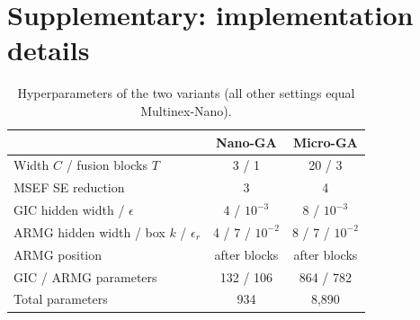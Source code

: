 \documentclass[10pt,twocolumn,letterpaper]{article}
\begin{document}
\section{Supplementary: implementation details}
\begin{table}[h]
\centering
\caption{Hyperparameters of the two variants (all other settings equal Multinex-Nano).}
\small
\begin{tabular}{lcc}
\toprule
 & Nano-GA & Micro-GA \\
\midrule
Width $C$ / fusion blocks $T$      & 3 / 1 & 20 / 3 \\
MSEF SE reduction                  & 3 & 4 \\
GIC hidden width / $\epsilon$      & 4 / $10^{-3}$ & 8 / $10^{-3}$ \\
ARMG hidden width / box $k$ / $\epsilon_r$ & 4 / 7 / $10^{-2}$ & 8 / 7 / $10^{-2}$ \\
ARMG position                      & after blocks & after blocks \\
GIC / ARMG parameters              & 132 / 106 & 864 / 782 \\
Total parameters                   & 934 & 8,890 \\
\bottomrule
\end{tabular}
\end{table}
\end{document}
